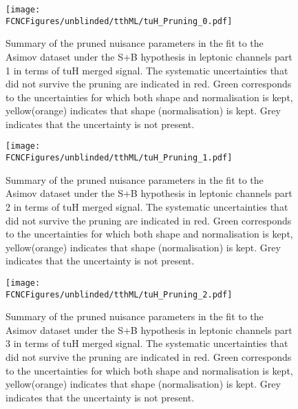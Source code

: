\begin{figure}[htb]
\centering
\texttt{[image: \\FCNCFigures/unblinded/tthML/tuH\_Pruning\_0.pdf]}
\caption{ Summary of the pruned nuisance parameters in the fit to the  Asimov dataset under the S+B hypothesis in leptonic channels part 1 in terms of tuH merged signal. The systematic uncertainties that did not survive the pruning are indicated in red. Green corresponds to the uncertainties for which both shape and normalisation is kept, yellow(orange) indicates that shape (normalisation) is kept. Grey indicates that the uncertainty is not present.}
\label{fig:tthML_pruning_0}
\end{figure}

\begin{figure}[htb]
\centering
\texttt{[image: \\FCNCFigures/unblinded/tthML/tuH\_Pruning\_1.pdf]}
\caption{ Summary of the pruned nuisance parameters in the fit to the  Asimov dataset under the S+B hypothesis in leptonic channels part 2 in terms of tuH merged signal. The systematic uncertainties that did not survive the pruning are indicated in red. Green corresponds to the uncertainties for which both shape and normalisation is kept, yellow(orange) indicates that shape (normalisation) is kept. Grey indicates that the uncertainty is not present. }
\label{fig:tthML_pruning_1}
\end{figure}

\begin{figure}[htb]
\centering
\texttt{[image: \\FCNCFigures/unblinded/tthML/tuH\_Pruning\_2.pdf]}
\caption{ Summary of the pruned nuisance parameters in the fit to the  Asimov dataset under the S+B hypothesis in leptonic channels part 3 in terms of tuH merged signal. The systematic uncertainties that did not survive the pruning are indicated in red. Green corresponds to the uncertainties for which both shape and normalisation is kept, yellow(orange) indicates that shape (normalisation) is kept. Grey indicates that the uncertainty is not present.}
\label{fig:tthML_pruning_2}
\end{figure}



